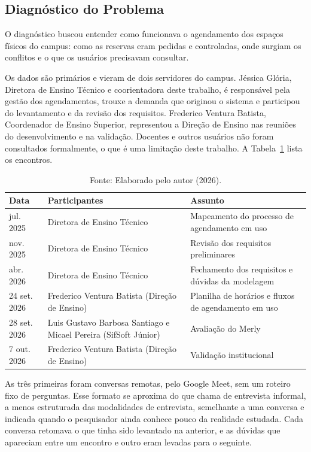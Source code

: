 \subsection{Diagnóstico do Problema}
\label{sec:coleta}

O diagnóstico buscou entender como funcionava o agendamento dos espaços físicos do campus: como as reservas eram pedidas e controladas, onde surgiam os conflitos e o que os usuários precisavam consultar.

Os dados são primários e vieram de dois servidores do campus. Jéssica Glória, Diretora de Ensino Técnico e coorientadora deste trabalho, é responsável pela gestão dos agendamentos, trouxe a demanda que originou o sistema e participou do levantamento e da revisão dos requisitos. Frederico Ventura Batista, Coordenador de Ensino Superior, representou a Direção de Ensino nas reuniões do desenvolvimento e na validação. Docentes e outros usuários não foram consultados formalmente, o que é uma limitação deste trabalho. A Tabela~\ref{tab:encontros} lista os encontros.

\begin{table}[!htb]
	\centering
	\caption{Encontros realizados durante a pesquisa}
	\begin{tabular}{@{}l>{\raggedright\arraybackslash}p{5.2cm}>{\raggedright\arraybackslash}p{5.6cm}@{}}
	\hline
		\textbf{Data} & \textbf{Participantes} & \textbf{Assunto} \\ \hline
		jul. 2025 & Diretora de Ensino Técnico & Mapeamento do processo de agendamento em uso \\
		nov. 2025 & Diretora de Ensino Técnico & Revisão dos requisitos preliminares \\
		abr. 2026 & Diretora de Ensino Técnico & Fechamento dos requisitos e dúvidas da modelagem \\
		24 set. 2026 & Frederico Ventura Batista (Direção de Ensino) & Planilha de horários e fluxos de agendamento em uso \\
		28 set. 2026 & Luis Gustavo Barbosa Santiago e Micael Pereira (SifSoft Júnior) & Avaliação do Merly \\
		7 out. 2026 & Frederico Ventura Batista (Direção de Ensino) & Validação institucional \\ \hline
	\end{tabular}
	\caption*{\footnotesize Fonte: Elaborado pelo autor (2026).}
	\label{tab:encontros}
\end{table}

As três primeiras foram conversas remotas, pelo Google Meet, sem um roteiro fixo de perguntas. Esse formato se aproxima do que  chama de entrevista informal, a menos estruturada das modalidades de entrevista, semelhante a uma conversa e indicada quando o pesquisador ainda conhece pouco da realidade estudada. Cada conversa retomava o que tinha sido levantado na anterior, e as dúvidas que apareciam entre um encontro e outro eram levadas para o seguinte.

